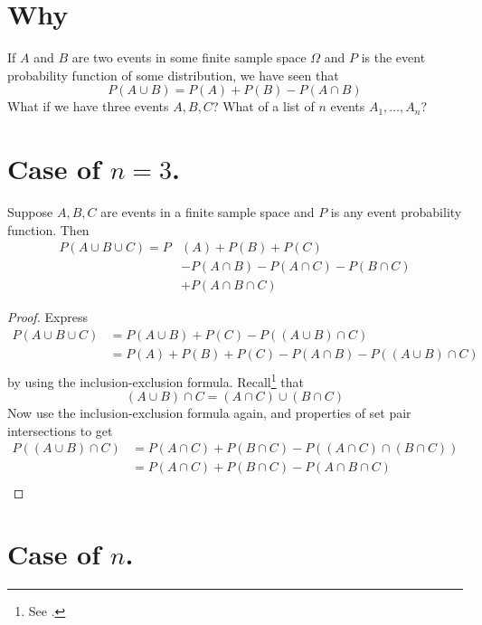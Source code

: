 
\section*{Why}

If $A$ and $B$ are two events in some finite sample space $\Omega $ and $P$ is the event probability function of some distribution, we have seen that
\[
P(A \cup B) = P(A) + P(B) - P(A \cap  B)
\]
What if we have three events $A, B, C$?
What of a list of $n$ events $A_1, \dots , A_n$?

\section*{Case of $n = 3$.}

\begin{proposition}
Suppose $A, B, C$ are events in a finite sample space and $P$ is any event probability function.
Then
\[
\begin{aligned}
P(A \cup B \cup C) = P&(A) + P(B) + P(C) \\ &- P(A \cap B) - P(A \cap  C) - P(B \cap  C) \\ &+ P(A \cap  B \cap  C)
\end{aligned}
\]
\end{proposition}

\begin{proof}Express
\[
\begin{aligned}
P(A \cup B \cup C)
&= P(A \cup B) + P(C) - P((A \cup B) \cap  C) \\
&= P(A) + P(B) + P(C) - P(A \cap  B) - P((A \cup B) \cap C) \\
\end{aligned}
\]
by using the inclusion-exclusion formula.
Recall\footnote{See .}
that
\[
(A \cup B) \cap  C = (A \cap  C) \cup (B \cap  C)
\]
Now use the inclusion-exclusion formula again, and properties of set pair intersections to get
\[
\begin{aligned}
P((A \cup B) \cap  C)
&= P(A \cap  C) + P(B \cap  C) - P((A \cap  C) \cap  (B \cap  C)) \\
&= P(A \cap  C) + P(B \cap  C) - P(A \cap  B \cap  C) \\
\end{aligned}
\]\end{proof}
\section*{Case of $n$.}

